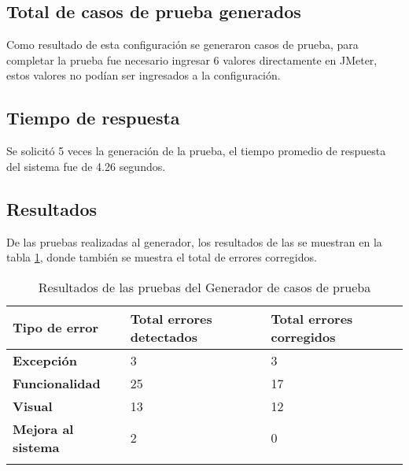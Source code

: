 \subsection*{Total de casos de prueba generados}
Como resultado de esta configuración se generaron \totalCasosPruebaCURegistrarPersona casos de prueba, para completar la prueba
fue necesario ingresar 6 valores directamente en JMeter, estos valores no podían ser ingresados a la configuración. 

\subsection*{Tiempo de respuesta}
Se solicitó 5 veces la generación de la prueba, el tiempo promedio de respuesta del sistema fue de 4.26 segundos.


\subsection*{Resultados}

De las pruebas realizadas al generador, los resultados de las se muestran en la tabla \ref{tabla:erroresGenerador}, donde también se muestra el total de errores corregidos.

\begin{longtable}{| p{} | p{} | p{} |}%
	\arrayrulecolor{black}%
	\rowcolor{black}%
	{\color{white}Tipo de error} & {\color{white}Total errores detectados} & {\color{white}Total errores corregidos}\\ \hline
	\endhead%
	\arrayrulecolor{black}%
	{\bf Excepción} & 3 & 3 \\ \hline
	{\bf Funcionalidad} & 25 & 17 \\ \hline
	{\bf Visual} & 13 & 12 \\ \hline
	{\bf Mejora al sistema} & 2 & 0 \\ \hline
	\caption{Resultados de las pruebas del Generador de casos de prueba}\label{tabla:erroresGenerador}
\end{longtable}

